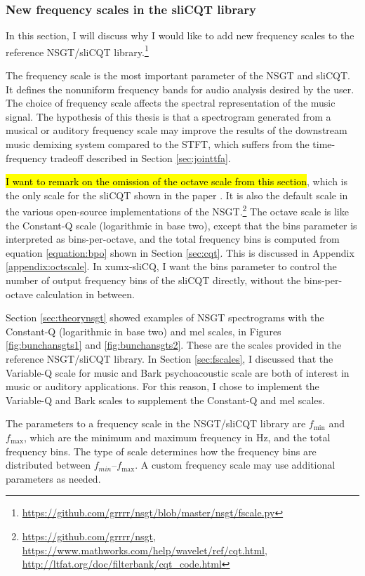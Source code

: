 \documentclass[report.tex]{subfiles}
\begin{document}
\subsubsection{New frequency scales in the sliCQT library}
\label{sec:improvelib}

In this section, I will discuss why I would like to add new frequency scales to the reference NSGT/sliCQT library.\footnote{\url{https://github.com/grrrr/nsgt/blob/master/nsgt/fscale.py}}

The frequency scale is the most important parameter of the NSGT and sliCQT. It defines the nonuniform frequency bands for audio analysis desired by the user. The choice of frequency scale affects the spectral representation of the music signal. The hypothesis of this thesis is that a spectrogram generated from a musical or auditory frequency scale may improve the results of the downstream music demixing system compared to the STFT, which suffers from the time-frequency tradeoff described in Section \ref{sec:jointtfa}.

\hl{I want to remark on the omission of the octave scale from this section}, which is the only scale for the sliCQT shown in the paper \parencite{slicq}. It is also the default scale in the various open-source implementations of the NSGT.\footnote{\url{https://github.com/grrrr/nsgt}, \url{https://www.mathworks.com/help/wavelet/ref/cqt.html}, \url{http://ltfat.org/doc/filterbank/cqt_code.html}} The octave scale is like the Constant-Q scale (logarithmic in base two), except that the bins parameter is interpreted as bins-per-octave, and the total frequency bins is computed from equation \eqref{equation:bpo} shown in Section \ref{sec:cqt}. This is discussed in Appendix \ref{appendix:octscale}. In xumx-sliCQ, I want the bins parameter to control the number of output frequency bins of the sliCQT directly, without the bins-per-octave calculation in between.

Section \ref{sec:theorynsgt} showed examples of NSGT spectrograms with the Constant-Q (logarithmic in base two) and mel scales, in Figures \ref{fig:bunchansgts1} and \ref{fig:bunchansgts2}. These are the scales provided in the reference NSGT/sliCQT library. In Section \ref{sec:fscales}, I discussed that the Variable-Q scale for music and Bark psychoacoustic scale are both of interest in music or auditory applications. For this reason, I chose to implement the Variable-Q and Bark scales to supplement the Constant-Q and mel scales.

The parameters to a frequency scale in the NSGT/sliCQT library are $f_{\text{min}}$ and $f_{\text{max}}$, which are the minimum and maximum frequency in Hz, and the total frequency bins. The type of scale determines how the frequency bins are distributed between $f_{min}$--$f_{\text{max}}$. A custom frequency scale may use additional parameters as needed.
\end{document}

